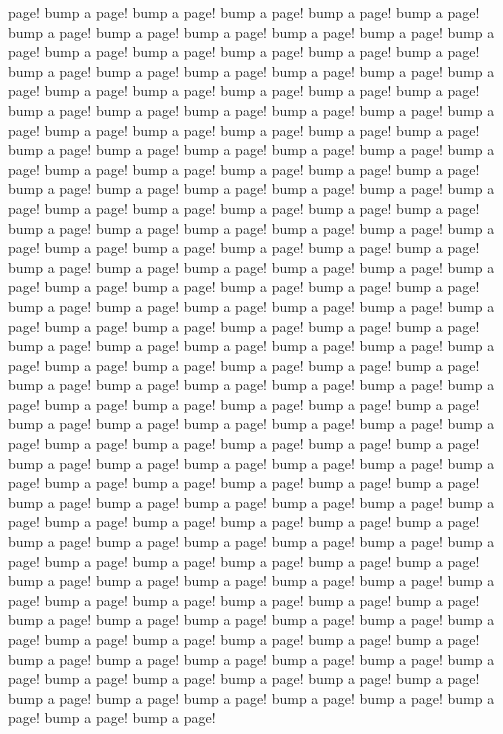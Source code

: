 \documentclass[11pt]{book}
\begin{document}
page! bump a page! bump a page!
bump a page! bump a page! bump a page! bump a page! bump a page! bump a page! bump a
page! bump a page! bump a page!
bump a page! bump a page! bump a page! bump a page! bump a page! bump a page! bump a
page! bump a page! bump a page!
bump a page! bump a page! bump a page! bump a page! bump a page! bump a page! bump a
page! bump a page! bump a page!
bump a page! bump a page! bump a page! bump a page! bump a page! bump a page! bump a
page! bump a page! bump a page!
bump a page! bump a page! bump a page! bump a page! bump a page! bump a page! bump a
page! bump a page! bump a page!
bump a page! bump a page! bump a page! bump a page! bump a page! bump a page! bump a
page! bump a page! bump a page!
bump a page! bump a page! bump a page! bump a page! bump a page! bump a page! bump a
page! bump a page! bump a page!
bump a page! bump a page! bump a page! bump a page! bump a page! bump a page! bump a
page! bump a page! bump a page!
bump a page! bump a page! bump a page! bump a page! bump a page! bump a page! bump a
page! bump a page! bump a page!
bump a page! bump a page! bump a page! bump a page! bump a page! bump a page! bump a
page! bump a page! bump a page!
bump a page! bump a page! bump a page! bump a page! bump a page! bump a page! bump a
page! bump a page! bump a page!
bump a page! bump a page! bump a page! bump a page! bump a page! bump a page! bump a
page! bump a page! bump a page!
bump a page! bump a page! bump a page! bump a page! bump a page! bump a page! bump a
page! bump a page! bump a page!
bump a page! bump a page! bump a page! bump a page! bump a page! bump a page! bump a
page! bump a page! bump a page!
bump a page! bump a page! bump a page! bump a page! bump a page! bump a page! bump a
page! bump a page! bump a page!
bump a page! bump a page! bump a page! bump a page! bump a page! bump a page! bump a
page! bump a page! bump a page!
bump a page! bump a page! bump a page! bump a page! bump a page! bump a page! bump a
page! bump a page! bump a page!
bump a page! bump a page! bump a page! bump a page! bump a page! bump a page! bump a
page! bump a page! bump a page!
bump a page! bump a page! bump a page! bump a page! bump a page! bump a page! bump a
page! bump a page! bump a page!
bump a page! bump a page! bump a page! bump a page! bump a page! bump a page! bump a
page! bump a page! bump a page!
bump a page! bump a page! bump a page! bump a page! bump a page! bump a page! bump a
page! bump a page! bump a page!
bump a page! bump a page! bump a page! bump a page! bump a page! bump a page! bump a
page! bump a page! bump a page!
\end{document}
